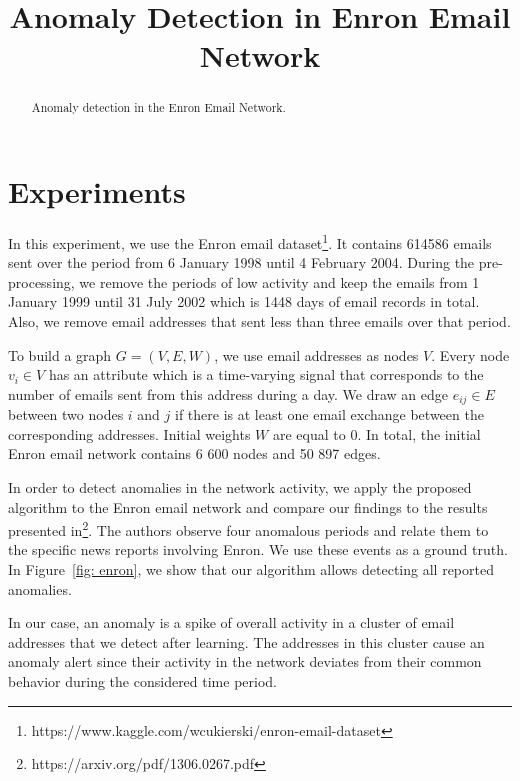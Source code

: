 \documentclass[]{article}
\title{Anomaly Detection in Enron Email Network}
\begin{document}
\maketitle

\begin{abstract}
Anomaly detection in the Enron Email Network.
\end{abstract}

\section{Experiments}
In this experiment, we use the Enron email dataset\footnote{https://www.kaggle.com/wcukierski/enron-email-dataset}. It contains 614586 emails sent over the period from 6 January 1998 until 4 February 2004. During the pre-processing, we remove the periods of low activity and keep the emails from 1 January 1999 until 31 July 2002 which is 1448 days of email records in total. Also, we remove email addresses that sent less than three emails over that period.

To build a graph \mbox{$G = (V,E,W)$}, we use email addresses as nodes $V$. Every node $v_i \in V$ has an attribute which is a time-varying signal that corresponds to the number of emails sent from this address during a day. We draw an edge $e_{ij} \in E$ between two nodes $i$ and $j$ if there is at least one email exchange between the corresponding addresses. Initial weights $W$ are equal to $0$. In total, the initial Enron email network contains 6 600 nodes and 50 897 edges.

In order to detect anomalies in the network activity, we apply the proposed algorithm to the Enron email network and compare our findings to the results presented in\footnote{https://arxiv.org/pdf/1306.0267.pdf}. The authors observe four anomalous periods and relate them to the specific news reports involving Enron. We use these events as a ground truth. In Figure~\ref{fig: enron}, we show that our algorithm allows detecting all reported anomalies.

In our case, an anomaly is a spike of overall activity in a cluster of email addresses that we detect after learning. The addresses in this cluster cause an anomaly alert since their activity in the network deviates from their common behavior during the considered time period.
\end{document}
